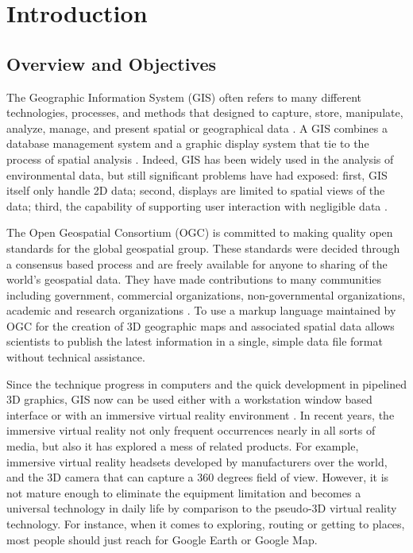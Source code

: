 \label{chapter-introduction}
\chapter{Introduction}

\section{Overview and Objectives}

The Geographic Information System (GIS) often refers to many different technologies, processes, and methods that designed to capture, store, manipulate, analyze, manage, and present spatial or geographical data \cite{wiki.gis.2016}. A GIS combines a database management system and a graphic display system that tie to the process of spatial analysis \cite{rhyne.virtual.1997}. Indeed, GIS has been widely used in the analysis of environmental data, but still significant problems have had exposed: first, GIS itself only handle 2D data; second, displays are limited to spatial views of the data; third, the capability of supporting user interaction with negligible data \cite{rhyne.visualization-gis.1994}. 

The Open Geospatial Consortium (OGC) is committed to making quality open standards for the global geospatial group. These standards were decided through a consensus based process and are freely available for anyone to sharing of the world's geospatial data. They have made contributions to many communities including government, commercial organizations, non-governmental organizations, academic and research organizations \cite{ogc.2016}. To use a markup language maintained by OGC for the creation of 3D geographic maps and associated spatial data allows scientists to publish the latest information in a single, simple data file format without technical assistance.

Since the technique progress in computers and the quick development in pipelined 3D graphics, GIS now can be used either with a workstation window based interface or with an immersive virtual reality environment \cite{koller.virtual-gis.1995}. In recent years, the immersive virtual reality not only frequent occurrences nearly in all sorts of media, but also it has explored a mess of related products. For example, immersive virtual reality headsets developed by manufacturers over the world, and the 3D camera that can capture a 360 degrees field of view. However, it is not mature enough to eliminate the equipment limitation and becomes a universal technology in daily life by comparison to the pseudo-3D virtual reality technology. For instance, when it comes to exploring, routing or getting to places, most people should just reach for Google Earth or Google Map.

